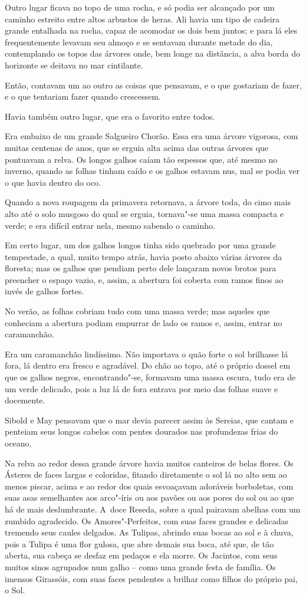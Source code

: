 Outro lugar ficava no topo de uma rocha, e só podia ser alcançado por
um caminho estreito entre altos arbustos de heras. Ali havia um tipo de
cadeira grande entalhada na rocha, capaz de acomodar os dois bem
juntos; e para lá eles frequentemente levavam seu almoço e se
sentavam durante metade do dia, contemplando os topos das árvores onde, bem
longe na distância, a alva borda do horizonte se deitava no mar
cintilante.

Então, contavam um ao outro as coisas que pensavam, e o que
gostariam de fazer, e o que tentariam fazer quando crescessem.

Havia também outro lugar, que era o favorito entre todos.

Era embaixo de um grande Salgueiro Chorão. Essa era uma árvore vigorosa,
com muitas centenas de anos, que se erguia alta acima das outras árvores
que pontuavam a relva. Os longos galhos caíam tão espessos que, até
mesmo no inverno, quando as folhas tinham caído e os galhos estavam nus,
mal se podia ver o que havia dentro do oco.

Quando a nova roupagem da primavera retornava, a árvore toda, do cimo mais
alto até o solo musgoso do qual se erguia, tornava"-se uma massa compacta
e verde; e era difícil entrar nela, mesmo sabendo o caminho.

Em certo lugar, um dos galhos longos tinha sido quebrado por uma grande
tempestade, a qual, muito tempo atrás, havia posto abaixo várias árvores
da floresta; mas os galhos que pendiam perto dele lançaram novos brotos
para preencher o espaço vazio, e, assim, a abertura foi coberta com
ramos finos ao invés de galhos fortes.

No verão, as folhas cobriam tudo com uma massa verde; mas aqueles que
conheciam a abertura podiam empurrar de lado os ramos e, assim, entrar
no caramanchão.

Era um caramanchão lindíssimo. Não importava o quão forte o sol
brilhasse lá fora, lá dentro era fresco e agradável. Do chão ao topo, até o
próprio dossel em que os galhos negros, encontrando"-se, formavam uma
massa escura, tudo era de um verde delicado, pois a luz lá de fora
entrava por meio das folhas suave e docemente.

Sibold e May pensavam que o mar devia parecer assim às Sereias, que
cantam e penteiam seus longos cabelos com pentes dourados nas
profundezas frias do oceano.

Na relva ao redor dessa grande árvore havia muitos canteiros de belas
flores. Os Ásteres de faces largas e coloridas, fitando diretamente o
sol lá no alto sem ao menos piscar, acima e ao redor dos quais esvoaçavam
adoráveis borboletas, com suas asas semelhantes aos arco"-íris ou aos
pavões ou aos pores do sol ou ao que há de mais deslumbrante. A~doce
Reseda, sobre a qual pairavam abelhas com um zumbido agradecido. Os
Amores"-Perfeitos, com suas faces grandes e delicadas tremendo seus
caules delgados. As Tulipas, abrindo suas bocas ao sol e à chuva, pois a
Tulipa é uma flor gulosa, que abre demais sua boca, até que, de tão
aberta, sua cabeça se desfaz em pedaços e ela morre. Os Jacintos, com
seus muitos sinos agrupados num galho -- como uma grande festa de
família. Os imensos Girassóis, com suas faces pendentes a brilhar como
filhos do próprio pai, o Sol.

